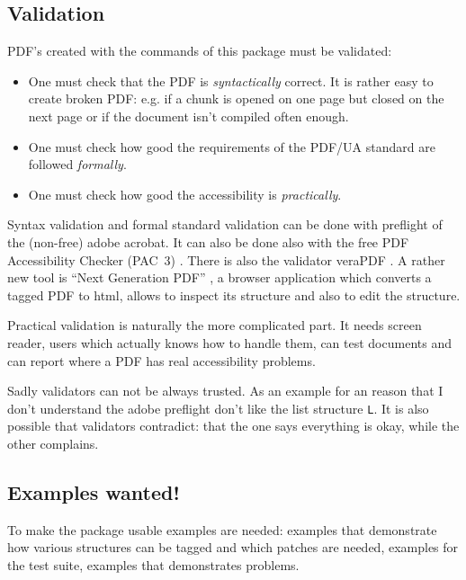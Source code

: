\documentclass[DIV=12,parskip=half-,bibliography=totoc]{scrartcl}
\newcommand\PDF{PDF}
\begin{document}
\subsection{Validation}


\PDF{}'s created with the commands of this package must be validated:

\begin{itemize}
\item
 One must check that the \PDF{} is \emph{syntactically} correct. It is rather easy to create broken \PDF{}:
 e.g. if a chunk is opened on one page but closed on the next page or if the document isn't compiled often enough.

\item
One must check how good the requirements of the PDF/UA standard are followed \emph{formally}.

\item
One must check how good the accessibility is \emph{practically}.
\end{itemize}


Syntax validation and formal standard validation can be done with preflight of the (non-free) adobe acrobat.
It can also be done also with the free \PDF{} Accessibility Checker (PAC~3) \parencite{pac3}.
There is also the validator veraPDF \parencite{verapdf}.
A rather new tool is \enquote{Next Generation PDF} \parencite{ngpdf}, a browser application which converts a tagged PDF to html, allows to inspect its structure and also to edit the structure.

Practical validation is naturally the more complicated part. It needs screen reader, users which actually knows how to handle them, can test documents and can report where a \PDF{} has real accessibility problems.



Sadly validators can not be always trusted. As an example for an reason that I don't understand the adobe preflight don't like the list structure \texttt{L}.
It is also possible that validators contradict: that the one says everything is okay, while the other complains.



\subsection{Examples wanted!}


To make the package usable examples are needed: examples that demonstrate how various structures can be tagged and which patches are needed, examples for the test suite, examples that demonstrates problems.
\end{document}
